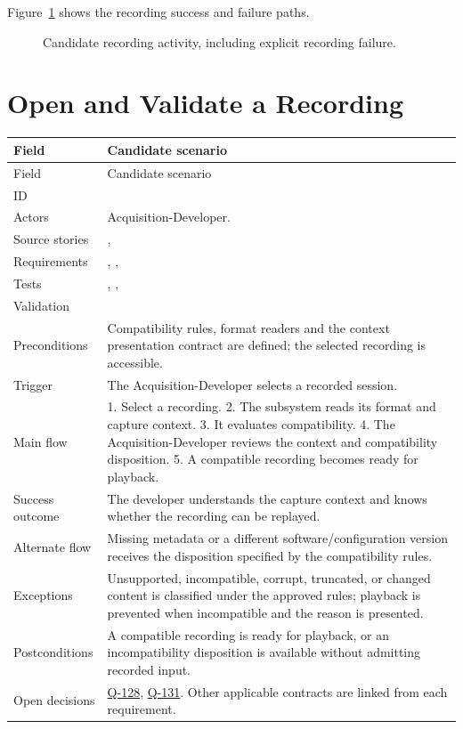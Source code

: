 \normalsize
Figure~\ref{Figure:RecordingActivity} shows the recording success and failure paths.
\begin{figure}[htbp]\centering
\resizebox{0.92\linewidth}{!}{}
\caption{Candidate recording activity, including explicit recording failure.}\label{Figure:RecordingActivity}
\end{figure}

\section{Open and Validate a Recording}
\par\medskip
\small
\begin{tabularx}{\linewidth}{L{2.8cm}Y}
\caption{Open and Validate a Recording\label{Table:UC-04}}\\
\toprule
Field & Candidate scenario\\\midrule
\endfirsthead
\toprule
Field & Candidate scenario\\\midrule
\endhead
\bottomrule
\endlastfoot
ID & \\
Actors & Acquisition-Developer.\\
Source stories & , \\
Requirements & , , \\
Tests & , , \\
Validation & \\
Preconditions & Compatibility rules, format readers and the context presentation contract are defined; the selected recording is accessible.\\
Trigger & The Acquisition-Developer selects a recorded session.\\
Main flow & 1. Select a recording. 2. The subsystem reads its format and capture context. 3. It evaluates compatibility. 4. The Acquisition-Developer reviews the context and compatibility disposition. 5. A compatible recording becomes ready for playback.\\
Success outcome & The developer understands the capture context and knows whether the recording can be replayed.\\
Alternate flow & Missing metadata or a different software/configuration version receives the disposition specified by the compatibility rules.\\
Exceptions & Unsupported, incompatible, corrupt, truncated, or changed content is classified under the approved rules; playback is prevented when incompatible and the reason is presented.\\
Postconditions & A compatible recording is ready for playback, or an incompatibility disposition is available without admitting recorded input.\\
Open decisions & \hyperref[Question:Q-128]{Q-128}, \hyperref[Question:Q-131]{Q-131}. Other applicable contracts are linked from each requirement.\\
\end{tabularx}
\normalsize

